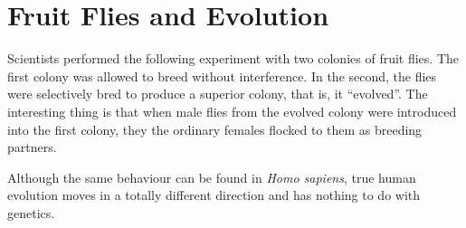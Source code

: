 \section{Fruit Flies and Evolution}

Scientists performed the following experiment with two colonies of fruit flies. The first colony was allowed to breed without interference. In the second, the flies were selectively bred to produce a superior colony, that is, it ``evolved''. The interesting thing is that when male flies from the evolved colony were introduced into the first colony, they the ordinary females flocked to them as breeding partners.

Although the same behaviour can be found in \emph{Homo sapiens}, true human evolution moves in a totally different direction and has nothing to do with genetics.



